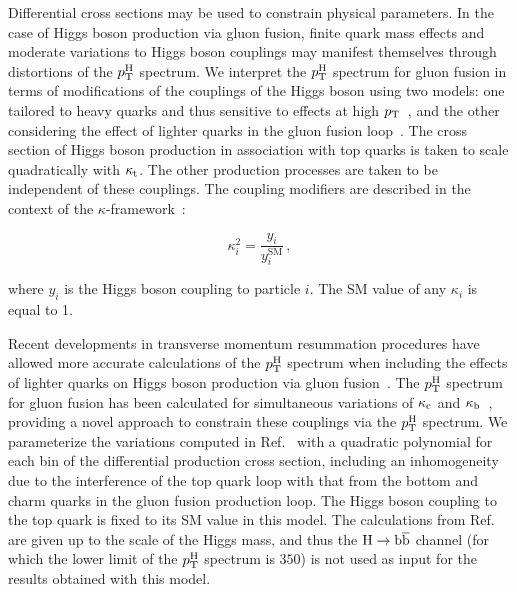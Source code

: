 


Differential cross sections may be used to constrain physical parameters.
% 
In the case of Higgs boson production via gluon fusion, finite quark mass effects and moderate variations to Higgs boson couplings may manifest themselves through distortions of the $p_\mathrm{T}^\mathrm{H}$ spectrum.
% 
We interpret the $p_\mathrm{T}^\mathrm{H}$ spectrum for gluon fusion in terms of modifications of the couplings of the Higgs boson using two models: one tailored to heavy quarks and thus sensitive to effects at high $p_\mathrm{T}$~\cite{Grazzini:2017szg,Grazzini:2016paz}, and the other considering the effect of lighter quarks in the gluon fusion loop~\cite{Bishara:2016jga}.
% 
The cross section of Higgs boson production in association with top quarks is taken to scale quadratically with $\kappa_{\mathrm{t}}$.
% 
The other production processes are taken to be independent of these couplings.
% 
The coupling modifiers are described in the context of the $\kappa$-framework~\cite{LHCHXSWG:YR3}:
% 
\begin{linenomath*}
\begin{equation}
\kappa_{i}^{2} = \frac{y_{i}}{y_{i}^{\text{SM}}}\,,
\end{equation}
\end{linenomath*}
% 
where $y_i$ is the Higgs boson coupling to particle $i$.
% 
The SM value of any $\kappa_i$ is equal to 1.


Recent developments in transverse momentum resummation procedures have allowed more accurate calculations of the $p_\mathrm{T}^\mathrm{H}$ spectrum when including the effects of lighter quarks on Higgs boson production via gluon fusion~\cite{Banfi:2013eda,Bozzi:2003jy,Becher:2010tm,Monni:2016ktx}.
% 
The $p_\mathrm{T}^\mathrm{H}$ spectrum for gluon fusion has been calculated for simultaneous variations of $\kappa_{\mathrm{c}}$ and $\kappa_{\mathrm{b}}$~\cite{Bishara:2016jga}, providing a novel approach to constrain these couplings via the $p_\mathrm{T}^\mathrm{H}$ spectrum.
% 
We parameterize the variations computed in Ref.~\cite{Bishara:2016jga} with a quadratic polynomial for each bin of the differential production cross section, including an inhomogeneity due to the interference of the top quark loop with that from the bottom and charm quarks in the gluon fusion production loop.
% 
The Higgs boson coupling to the top quark is fixed to its SM value in this model.
% 
The calculations from Ref.~\cite{Bishara:2016jga} are given up to the scale of the Higgs mass, and thus the $\mathrm{H}\to\mathrm{b}\overline{\mathrm{b}}$ channel (for which the lower limit of the $p_\mathrm{T}^\mathrm{H}$ spectrum is $350$\GeV) is not used as input for the results obtained with this model.


